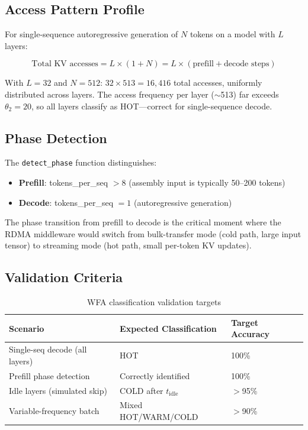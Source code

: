 \documentclass[11pt,letterpaper]{article}
\begin{document}
\subsection{Access Pattern Profile}

For single-sequence autoregressive generation of $N$ tokens on a model with $L$ layers:

\begin{equation}
    \text{Total KV accesses} = L \times (1 + N) = L \times (\text{prefill} + \text{decode steps})
\end{equation}

With $L = 32$ and $N = 512$: $32 \times 513 = 16{,}416$ total accesses, uniformly distributed across layers. The access frequency per layer ($\sim$513) far exceeds $\theta_2 = 20$, so all layers classify as HOT---correct for single-sequence decode.

\subsection{Phase Detection}

The \texttt{detect\_phase} function distinguishes:
\begin{itemize}
    \item \textbf{Prefill}: tokens\_per\_seq $> 8$ (assembly input is typically 50--200 tokens)
    \item \textbf{Decode}: tokens\_per\_seq $= 1$ (autoregressive generation)
\end{itemize}

The phase transition from prefill to decode is the critical moment where the RDMA middleware would switch from bulk-transfer mode (cold path, large input tensor) to streaming mode (hot path, small per-token KV updates).

\subsection{Validation Criteria}

\begin{table}[htbp]
\centering
\caption{WFA classification validation targets}
\label{tab:validation-targets}
\begin{tabular}{@{}lll@{}}
\toprule
\textbf{Scenario} & \textbf{Expected Classification} & \textbf{Target Accuracy} \\
\midrule
Single-seq decode (all layers) & HOT & 100\% \\
Prefill phase detection & Correctly identified & 100\% \\
Idle layers (simulated skip) & COLD after $t_{\text{idle}}$ & $>$95\% \\
Variable-frequency batch & Mixed HOT/WARM/COLD & $>$90\% \\
\bottomrule
\end{tabular}
\end{table}
\end{document}
